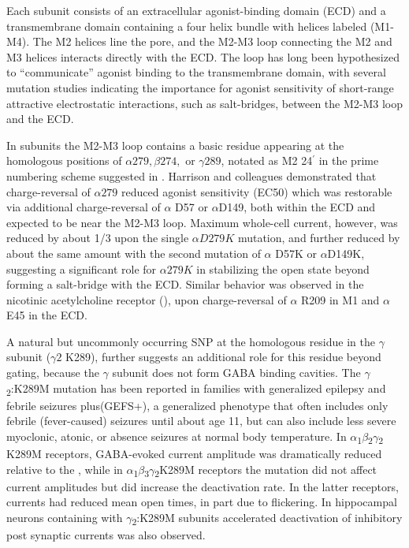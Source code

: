 \documentclass[12pt,onecolumn]{biophys}
\begin{document}
Each subunit consists of an extracellular agonist-binding domain (ECD) and a transmembrane domain containing a four helix bundle with helices labeled (M1-M4).  The M2 helices line the pore, and the M2-M3 loop connecting the M2 and M3 helices interacts directly with the ECD.  The loop has long been hypothesized to ``communicate'' agonist binding to the transmembrane domain,\cite{Campos-Caro1996,Lynch1997,Grosman2000,Bera2002,Lummis2005,Law2005,Lee2005,Unwin2005, Lee2009} with several mutation studies indicating the importance for agonist sensitivity of short-range attractive electrostatic interactions, such as salt-bridges, between the M2-M3 loop and the ECD. \cite{Sigel1999, OShea2000, Kash2003, Hales2006} 

In \GABAA subunits the M2-M3 loop contains a basic residue appearing at the homologous positions of $\alpha279, \beta274,$ or $\gamma289$, notated as M2 24$^{\prime}$ in the prime numbering scheme suggested in \cite{Jaiteh2016}.  Harrison and colleagues\cite{Kash2003} demonstrated that charge-reversal of $\alpha279$ reduced agonist sensitivity (EC50) which was restorable via additional charge-reversal of $\alpha$ D57 or $\alpha$D149, both within the ECD and expected to be near the M2-M3 loop.  Maximum whole-cell current, however, was reduced by about 1/3 upon the single $\alpha D279K$ mutation, and further reduced by about the same amount with the second mutation of $\alpha$ D57K or $\alpha$D149K, suggesting a significant role for $\alpha279K$ in stabilizing the open state beyond forming a salt-bridge with the ECD.  Similar behavior was observed in the nicotinic acetylcholine receptor (\nachr), upon charge-reversal of  $\alpha$ R209 in M1 and $\alpha$ E45 in the ECD.\cite{Lee2005}  

A natural but uncommonly occurring SNP at the homologous residue in the $\gamma$ subunit ($\gamma2$ K289), further suggests an additional role for this residue beyond gating, because the $\gamma$ subunit does not form GABA binding cavities. The \(\gamma\)\textsubscript{2}:K289M mutation has been reported in families with generalized epilepsy and febrile seizures plus(GEFS+)\cite{Mac2010,Baulac2001,Bianchi2002}, a generalized phenotype that often includes only febrile (fever-caused) seizures until about age 11, but can also include less severe myoclonic, atonic, or absence seizures at normal body temperature.  In \(\alpha\)\textsubscript{1}\(\beta\)\textsubscript{2}\(\gamma\)\textsubscript{2} K289M receptors, GABA-evoked current amplitude was dramatically reduced relative to the \WT \cite{Baulac2001,Ramakrishnan2004}, while in \(\alpha\)\textsubscript{1}\(\beta\)\textsubscript{3}\(\gamma\)\textsubscript{2}K289M receptors the mutation did not affect current amplitudes but did increase the deactivation rate\cite{Eugene2007}. In the latter receptors, currents had reduced mean open times, in part due to flickering\cite{Bianchi2002,Macdonald2006,Hales2006}. In hippocampal neurons containing \GABAA with \(\gamma\)\textsubscript{2}:K289M subunits %
accelerated deactivation of inhibitory post synaptic currents was also observed\cite{Eugene2007}.
\end{document}

